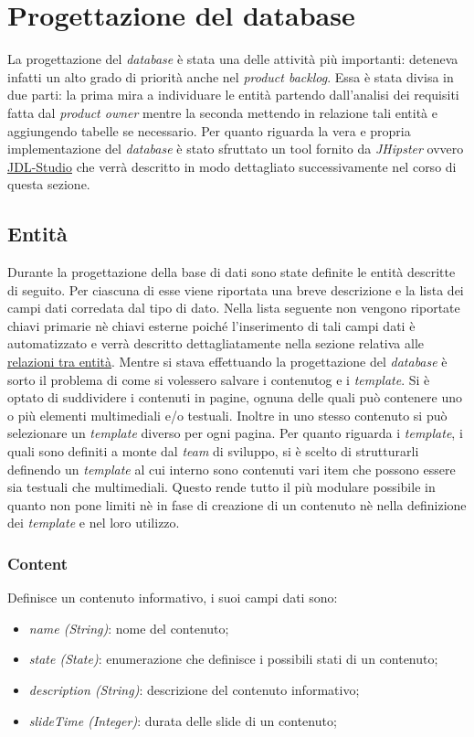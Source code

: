 \section{Progettazione del database}
La progettazione del \textit{database} è stata una delle attività più importanti: deteneva infatti un alto grado di priorità anche nel \textit{product backlog}. Essa è stata divisa in due parti: la prima mira a individuare le entità partendo dall'analisi dei requisiti fatta dal \textit{product owner} mentre la seconda mettendo in relazione tali entità e aggiungendo tabelle se necessario. Per quanto riguarda la vera e propria implementazione del \textit{database} è stato sfruttato un tool fornito da \textit{JHipster} ovvero \href{https://start.JHipster.tech/jdl-studio/}{JDL-Studio} che verrà descritto in modo dettagliato successivamente nel corso di questa sezione.

\subsection{Entità}
Durante la progettazione della base di dati sono state definite le entità descritte di seguito.
Per ciascuna di esse viene riportata una breve descrizione e la lista dei campi dati corredata dal tipo di dato. Nella lista seguente non vengono riportate chiavi primarie nè chiavi esterne poiché l'inserimento di tali campi dati è automatizzato e verrà descritto dettagliatamente nella sezione relativa alle \hyperref[rel]{relazioni tra entità}.
Mentre si stava effettuando la progettazione del \textit{database} è sorto il problema di come si volessero salvare i \gls{contenutog} e i \textit{template}. Si è optato di suddividere i contenuti in pagine, ognuna delle quali può contenere uno o più elementi multimediali e/o testuali. Inoltre in uno stesso contenuto si può selezionare un \textit{template} diverso per ogni pagina. Per quanto riguarda i \textit{template}, i quali sono definiti a monte dal \textit{team} di sviluppo, si è scelto di strutturarli definendo un \textit{template} al cui interno sono contenuti vari item che possono essere sia testuali che multimediali. Questo rende tutto il più modulare possibile in quanto non pone limiti nè in fase di creazione di un contenuto nè nella definizione dei \textit{template} e nel loro utilizzo. 
\subsubsection{Content}
Definisce un contenuto informativo, i suoi campi dati sono:
\begin{itemize}
    \item \textit{name (String)}: nome del contenuto;
    \item \textit{state (State)}: enumerazione che definisce i possibili stati di un contenuto;
    \item \textit{description (String)}: descrizione del contenuto informativo;
    \item \textit{slideTime (Integer)}: durata delle slide di un contenuto;
\end{itemize}

